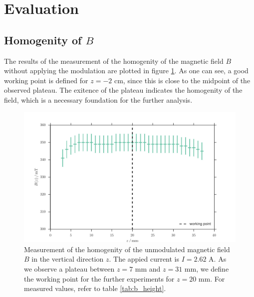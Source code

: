 \section{Evaluation}
\subsection{Homogenity of $B$}
The results of the measurement of the homogenity of the magnetic field $B$ 
without applying the modulation are plotted in figure 
\ref{fig:b_height}. As one can see, a good working point is defined for $z = -2$ cm, since 
this is close to the midpoint of the observed plateau. The exitence of the plateau indicates the homogenity 
of the field, which is a necessary foundation for the further analysis.
\begin{figure}[H]
    \centering
    \includegraphics[width=1.0\textwidth]{figures/b_height.pdf}
    \caption{   
        Measurement of the homogenity of the unmodulated magnetic field $B$ in the vertical direction $z$. 
        The appied current is $I = 2.62$ A. As we observe a plateau between $z = 7$ mm and $z = 31$ mm, 
        we define the working point for the further experiments for $z = 20$ mm.
        For measured values, refer to table \ref{tab:b_height}.
        }
    \label{fig:b_height}
\end{figure}
\FloatBarrier


